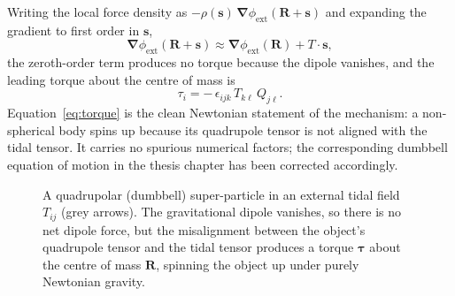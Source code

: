 \documentclass[11pt,a4paper]{article}
\newcommand{\grad}{\bm{\nabla}}
\newcommand{\svec}{\mathbf{s}}
\newcommand{\RR}{\mathbf{R}}
\begin{document}
Writing the local force density as $-\rho(\svec)\,\grad\phi_{\mathrm{ext}}(\RR+\svec)$ and
expanding the gradient to first order in $\svec$,
%
\begin{equation}
  \grad\phi_{\mathrm{ext}}(\RR+\svec) \approx
  \grad\phi_{\mathrm{ext}}(\RR) + T\cdot\svec ,
\end{equation}
%
the zeroth-order term produces no torque because the dipole vanishes, and the leading
torque about the centre of mass is
%
\begin{equation}
  \tau_i = -\,\epsilon_{ijk}\,T_{k\ell}\,Q_{j\ell}.
  \label{eq:torque}
\end{equation}
%
Equation~\eqref{eq:torque} is the clean Newtonian statement of the mechanism: a
non-spherical body spins up because its quadrupole tensor is not aligned with the tidal
tensor. It carries no spurious numerical factors; the corresponding dumbbell equation
of motion in the thesis chapter has been corrected accordingly.

\begin{figure}[t]
\centering
{}
\caption{A quadrupolar (dumbbell) super-particle in an external tidal field $T_{ij}$
(grey arrows). The gravitational dipole vanishes, so there is no net dipole force, but
the misalignment between the object's quadrupole tensor and the tidal tensor produces a
torque $\boldsymbol{\tau}$ about the centre of mass $\RR$, spinning the object up under
purely Newtonian gravity.}
\label{fig:dumbbell}
\end{figure}
\end{document}
